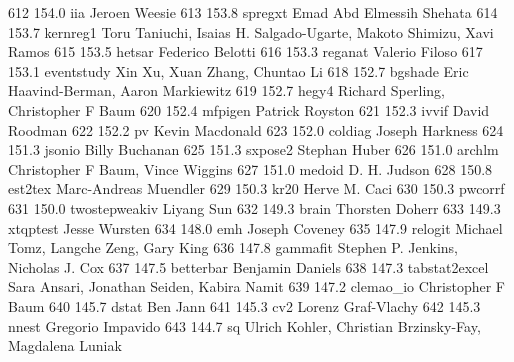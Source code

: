    612    154.0    iia           Jeroen Weesie                           
   613    153.8    spregxt       Emad Abd Elmessih Shehata               
   614    153.7    kernreg1      Toru Taniuchi, Isaias H.                
                                   Salgado-Ugarte, Makoto Shimizu, Xavi    
                                   Ramos                                   
   615    153.5    hetsar        Federico Belotti                        
   616    153.3    reganat       Valerio Filoso                          
   617    153.1    eventstudy    Xin Xu, Xuan Zhang, Chuntao Li          
   618    152.7    bgshade       Eric Haavind-Berman, Aaron Markiewitz   
   619    152.7    hegy4         Richard Sperling, Christopher F Baum    
   620    152.4    mfpigen       Patrick Royston                         
   621    152.3    ivvif         David Roodman                           
   622    152.2    pv            Kevin Macdonald                         
   623    152.0    coldiag       Joseph Harkness                         
   624    151.3    jsonio        Billy Buchanan                          
   625    151.3    sxpose2       Stephan Huber                           
   626    151.0    archlm        Christopher F Baum, Vince Wiggins       
   627    151.0    medoid        D. H. Judson                            
   628    150.8    est2tex       Marc-Andreas Muendler                   
   629    150.3    kr20          Herve M. Caci                           
   630    150.3    pwcorrf                                               
   631    150.0    twostepweakiv  Liyang Sun                              
   632    149.3    brain         Thorsten Doherr                         
   633    149.3    xtqptest      Jesse Wursten                           
   634    148.0    emh           Joseph Coveney                          
   635    147.9    relogit       Michael Tomz, Langche Zeng, Gary King   
   636    147.8    gammafit      Stephen P. Jenkins, Nicholas J. Cox     
   637    147.5    betterbar     Benjamin Daniels                        
   638    147.3    tabstat2excel  Sara Ansari, Jonathan Seiden, Kabira    
                                   Namit                                   
   639    147.2    clemao_io     Christopher F Baum                      
   640    145.7    dstat         Ben Jann                                
   641    145.3    cv2           Lorenz Graf-Vlachy                      
   642    145.3    nnest         Gregorio Impavido                       
   643    144.7    sq            Ulrich Kohler, Christian Brzinsky-Fay,  
                                   Magdalena Luniak                        
